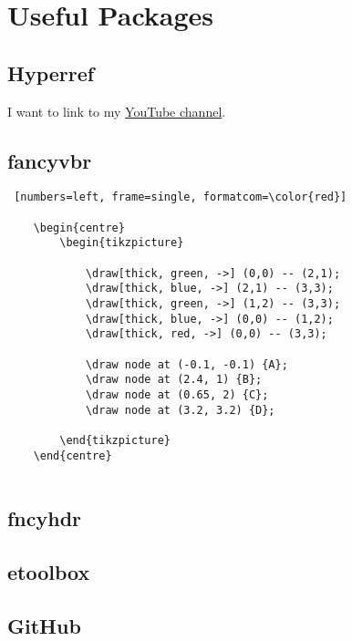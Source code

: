 \documentclass{report}
\begin{document}
\tableofcontents

\chapter{Useful Packages}

\section{Hyperref}
I want to link to my \href{https://youtube.com/drtreforbazett}{YouTube channel}.

\section{fancyvbr}

\begin{verbatim} [numbers=left, frame=single, formatcom=\color{red}]
    
    \begin{centre}
        \begin{tikzpicture}
            
            \draw[thick, green, ->] (0,0) -- (2,1);
            \draw[thick, blue, ->] (2,1) -- (3,3);
            \draw[thick, green, ->] (1,2) -- (3,3);
            \draw[thick, blue, ->] (0,0) -- (1,2);
            \draw[thick, red, ->] (0,0) -- (3,3);

            \draw node at (-0.1, -0.1) {A};
            \draw node at (2.4, 1) {B};
            \draw node at (0.65, 2) {C};
            \draw node at (3.2, 3.2) {D};
            
        \end{tikzpicture}
    \end{centre}
    
\end{verbatim}



\section{fncyhdr}

\section{etoolbox}

\section{GitHub}
\end{document}
